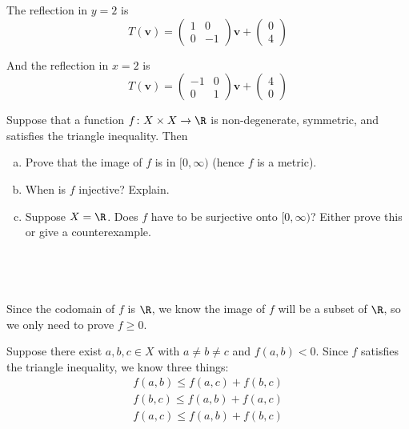\documentclass[a4paper]{article}
\begin{document}
The reflection in $y=2$ is \[ T(\mathbf v) = \begin{pmatrix} 1 & 0 \\ 0 & -1 \end{pmatrix} \mathbf v + \begin{pmatrix} 0 \\ 4 \end{pmatrix} \]

And the reflection in $x=2$ is \[ T(\mathbf v) = \begin{pmatrix} -1 & 0 \\ 0 & 1 \end{pmatrix} \mathbf v + \begin{pmatrix} 4 \\ 0 \end{pmatrix} \]



\begin{questionbody}
Suppose that a function $f \colon X \times X \to \R$ is non-degenerate, symmetric, and satisfies the triangle inequality. Then \begin{enumerate}[(a)]
\item Prove that the image of $f$ is in $[0, \infty)$ (hence $f$ is a metric). %
\item When is $f$ injective? Explain.
\item Suppose $X = \R$. Does $f$ have to be surjective onto $[0, \infty)$? Either prove this or give a counterexample. %
\end{enumerate}
\end{questionbody}

\subsection{~} %

Since the codomain of $f$ is $\R$, we know the image of $f$ will be a subset of $\R$, so we only need to prove $f \ge 0$.

Suppose there exist $a, b, c \in X$ with $a \ne b \ne c$ and $f(a, b) < 0$. Since $f$ satisfies the triangle inequality, we know three things: \begin{align*}
f(a, b) \le f(a, c) + f(b, c) \\
f(b, c) \le f(a, b) + f(a, c) \\
f(a, c) \le f(a, b) + f(b, c)
\end{align*}
\end{document}
